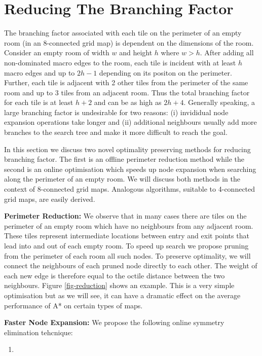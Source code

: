 \section{Reducing The Branching Factor}
The branching factor associated with each tile on the perimeter of an empty room (in an 8-connected 
grid map) is dependent on the dimensions of the room.
Consider an empty room of width $w$ and height $h$ where $w > h$.
After adding all non-dominated macro edges to the room, each tile is incident with at least $h$ macro edges and up to $2h-1$ 
depending on its positon on the perimeter.
Further, each tile is adjacent with 2 other tiles from the perimeter of the same room and up to 3 tiles from an adjacent room.
Thus the total branching factor for each tile is at least $h + 2$ and can be as high
as $2h + 4$.
Generally speaking, a large branching factor is undesirable for two reasons:
(i) invididual node expansion operations take longer and (ii) additional neighbours usually 
add more branches to the search tree and make it more difficult to reach the goal.
\par
In this section we discuss two novel optimality preserving methods for reducing branching factor. 
The first is an offline perimeter reduction method while the second is an online optimisation which speeds up 
node expansion when searching along the perimeter of an empty room.
We will discuss both methods in the context of 8-connected grid maps.
Analogous algorithms, suitable to 4-connected grid maps, are easily derived.
\par \noindent \newline
\textbf{Perimeter Reduction:}
We observe that in many cases there are tiles on the perimeter of an empty room which have no neighbours from any 
adjacent room. 
These tiles represent intermediate locations between entry and exit points that lead into and out of each empty room.
To speed up search we propose pruning from the perimeter of each room all such nodes.
To preserve optimality, we will connect the neighbours of each pruned node directly to each other.
The weight of each new edge is therefore equal to the octile distance between the two neighbours.
Figure \ref{fig-reduction} shows an example.
This is a very simple optimisation but as we will see, it can have a dramatic effect on the average performance of
A* on certain types of maps.
\par \noindent \newline
\textbf{Faster Node Expansion:} 
We propose the following online symmetry elimination tehcnique:
\begin{enumerate}
\item{}
\end{enumerate}

